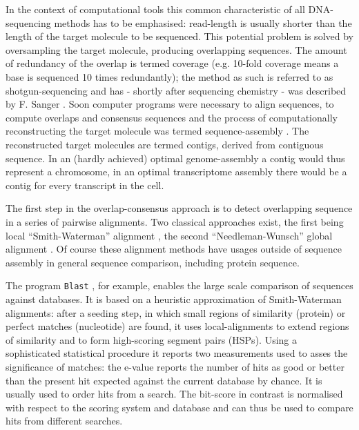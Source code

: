 In the context of computational tools this common characteristic of
all DNA-sequencing methods has to be emphasised: read-length is
usually shorter than the length of the target molecule to be
sequenced. This potential problem is solved by oversampling the target
molecule, producing overlapping sequences. The amount of redundancy of
the overlap is termed coverage (e.g. 10-fold coverage means a base is
sequenced 10 times redundantly); the method as such is referred to as
shotgun-sequencing and has - shortly after sequencing chemistry - was
described by F. Sanger \cite{pmid6260957}. Soon computer programs were
necessary to align sequences, to compute overlaps and consensus
sequences \cite{pmid461197} and the process of computationally
reconstructing the target molecule was termed sequence-assembly
\cite{pmid6251542}. The reconstructed target molecules are termed
contigs, derived from contiguous sequence. In an (hardly achieved)
optimal genome-assembly a contig would thus represent a chromosome, in
an optimal transcriptome assembly there would be a contig for every
transcript in the cell.

The first step in the overlap-consensus approach is to detect
overlapping sequence in a series of pairwise alignments. Two classical
approaches exist, the first being local ``Smith-Waterman'' alignment
\cite{pmid7265238}, the second ``Needleman-Wunsch'' global alignment
\cite{pmid7334527}. Of course these alignment methods have usages
outside of sequence assembly in general sequence comparison, including
protein sequence.

The program \texttt{Blast} \cite{pmid2231712}, for example, enables
the large scale comparison of sequences against databases. It is based
on a heuristic approximation of Smith-Waterman alignments: after a
seeding step, in which small regions of similarity (protein) or
perfect matches (nucleotide) are found, it uses local-alignments to
extend regions of similarity and to form high-scoring segment pairs
(HSPs). Using a sophisticated statistical procedure it reports two
measurements used to asses the significance of matches: the e-value
reports the number of hits as good or better than the present hit
expected against the current database by chance. It is usually used to
order hits from a search. The bit-score in contrast is normalised with
respect to the scoring system and database and can thus be used to
compare hits from different searches.

